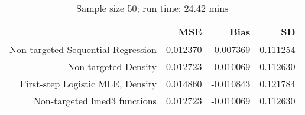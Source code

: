 \begin{table}[ht]
\centering
\caption{Sample size 50; run time: 24.42 mins} 
\begin{tabular}{rrrr}
  \hline
 & MSE & Bias & SD \\ 
  \hline
Non-targeted Sequential Regression & 0.012370 & -0.007369 & 0.111254 \\ 
  Non-targeted Density & 0.012723 & -0.010069 & 0.112630 \\ 
  First-step Logistic MLE, Density & 0.014860 & -0.010843 & 0.121784 \\ 
  Non-targeted lmed3 functions & 0.012723 & -0.010069 & 0.112630 \\ 
   \hline
\end{tabular}
\end{table}
